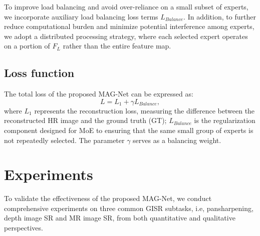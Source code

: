 \documentclass[lettersize,journal]{IEEEtran}
\begin{document}
To improve load balancing and avoid over-reliance on a small subset of experts, we incorporate auxiliary load balancing loss terms $L_{Balance}$. In addition, to further reduce computational burden and minimize potential interference among experts, we adopt a distributed processing strategy, where each selected expert operates on a portion of $F_L$ rather than the entire feature map.

 


\subsection{Loss function}
The total loss of the proposed MAG-Net can be expressed as:
\begin{equation}
L = L_{1} + \gamma L_{Balance},
\end{equation}
where $L_{1}$ represents the reconstruction loss, measuring the difference between the reconstructed HR image and the ground truth (GT); $L_{Balance}$ is the regularization component designed for MoE to ensuring that the same small group of experts is not repeatedly selected. The parameter $\gamma$ serves as a balancing weight.

\section{Experiments}
To validate the effectiveness of the proposed MAG-Net, we conduct comprehensive experiments on three common GISR subtasks, i.e, pansharpening, depth image SR and MR image SR, from both quantitative and qualitative perspectives.
\end{document}
